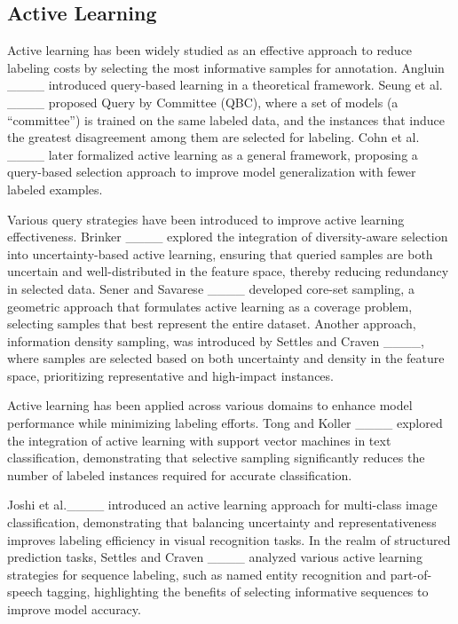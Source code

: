 \subsection{Active Learning}


Active learning has been widely studied as an effective approach to reduce labeling costs by selecting the most informative samples for annotation. Angluin ____ introduced query-based learning in a theoretical framework. Seung et al. ____ proposed Query by Committee (QBC), where a set of models (a “committee”) is trained on the same labeled data, and the instances that induce the greatest disagreement among them are selected for labeling. Cohn et al. ____ later formalized active learning as a general framework, proposing a query-based selection approach to improve model generalization with fewer labeled examples.

Various query strategies have been introduced to improve active learning effectiveness. Brinker ____ explored the integration of diversity-aware selection into uncertainty-based active learning, ensuring that queried samples are both uncertain and well-distributed in the feature space, thereby reducing redundancy in selected data. Sener and Savarese ____ developed core-set sampling, a geometric approach that formulates active learning as a coverage problem, selecting samples that best represent the entire dataset. Another approach, information density sampling, was introduced by Settles and Craven ____, where samples are selected based on both uncertainty and density in the feature space, prioritizing representative and high-impact instances.

Active learning has been applied across various domains to enhance model performance while minimizing labeling efforts. Tong and Koller ____ explored the integration of active learning with support vector machines in text classification, demonstrating that selective sampling significantly reduces the number of labeled instances required for accurate classification. 

Joshi et al.____ introduced an active learning approach for multi-class image classification, demonstrating that balancing uncertainty and representativeness improves labeling efficiency in visual recognition tasks. In the realm of structured prediction tasks, Settles and Craven ____ analyzed various active learning strategies for sequence labeling, such as named entity recognition and part-of-speech tagging, highlighting the benefits of selecting informative sequences to improve model accuracy.